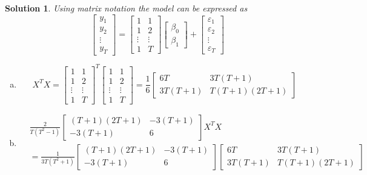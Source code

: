 \documentclass[a4paper,UTF8]{article}
\numberwithin{equation}{section}
\newtheorem*{mySol}{Solution}
\begin{document}
\begin{enumerate}
 \begin{mySol}
     Using matrix notation the model can be expressed as
     $$
     \begin{bmatrix}y_1\\y_2\\\vdots\\y_T\end{bmatrix}
     =\begin{bmatrix}1&1\\1&2\\\vdots&\vdots\\1&T\end{bmatrix}
     \begin{bmatrix}\beta_0\\\beta_1\end{bmatrix}
     +\begin{bmatrix}\varepsilon_1\\\varepsilon_2\\\vdots\\\varepsilon_T\end{bmatrix}
     $$
 	\begin{enumerate}[a.]
         \item $$
         X^TX=\begin{bmatrix}1&1\\1&2\\\vdots&\vdots\\1&T\end{bmatrix}^T\begin{bmatrix}1&1\\1&2\\\vdots&\vdots\\1&T\end{bmatrix}
         =\frac{1}{6}\left[\begin{array}{cc}6 T & 3 T(T+1) \\ 3 T(T+1) & T(T+1)(2 T+1)\end{array}\right]
         $$
         \item \begin{align*}
             &\frac{2}{T\left(T^2-1\right)}\left[\begin{array}{cc}(T+1)(2 T+1) & -3(T+1) \\ -3(T+1) & 6\end{array}\right]X^TX \\
             &= \frac{1}{3T(T^2+1)}\left[\begin{array}{cc}(T+1)(2 T+1) & -3(T+1) \\ -3(T+1) & 6\end{array}\right]\left[\begin{array}{cc}6 T & 3 T(T+1) \\ 3 T(T+1) & T(T+1)(2 T+1)\end{array}\right] \\

\end{align*}
\end{enumerate}
\end{mySol}
\end{enumerate}
\end{document}
